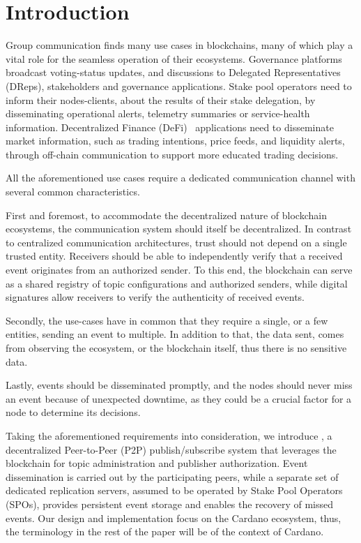 \section{Introduction}
\label{sec:introduction}

Group communication finds many use cases in blockchains, many of which play a vital role for the seamless
operation of their ecosystems.
Governance platforms~\cite{CIP-1694, DAO-White-Paper, eGov-DAO} broadcast voting-status updates, and discussions to 
Delegated Representatives (DReps), stakeholders and governance applications.
Stake pool operators need to inform their nodes-clients, about the results of their stake delegation,
by disseminating operational alerts, telemetry summaries or service-health information.
Decentralized Finance (DeFi)~\cite{Cardano-DeFi} applications need to disseminate market information, such as trading intentions,
price feeds, and liquidity alerts, through off-chain communication to support more educated trading decisions.

All the aforementioned use cases require a dedicated communication channel with several common characteristics.

First and foremost, to accommodate the decentralized nature of blockchain ecosystems, the communication system should itself be decentralized.
In contrast to centralized communication architectures, trust should not depend on a single trusted entity.
Receivers should be able to independently verify that a received event originates from an authorized sender.
To this end, the blockchain can serve as a shared registry of topic configurations and authorized senders, while digital signatures allow receivers to verify the authenticity of received events.

Secondly, the use-cases have in common that they require a single, or a few entities, sending an event to multiple.
In addition to that, the data sent, comes from observing the ecosystem, or the blockchain itself, thus there is no sensitive data.

Lastly, events should be disseminated promptly, and the nodes should never miss an event because of unexpected downtime, as they could be a crucial factor for a node to determine its decisions.

Taking the aforementioned requirements into consideration, we introduce \system, a decentralized Peer-to-Peer (P2P) publish/subscribe system that leverages the blockchain for topic administration and publisher authorization.
Event dissemination is carried out by the participating peers, while a separate set of dedicated replication servers, assumed to be operated by Stake Pool Operators (SPOs), provides persistent event storage and enables the recovery of missed events.
Our design and implementation focus on the Cardano ecosystem, thus, the terminology in the rest of the paper will be of the context of Cardano.

